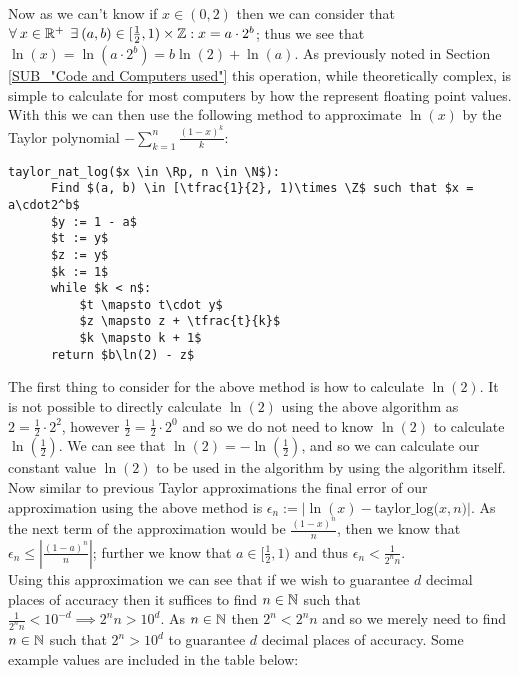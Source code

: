 Now as we can't know if \(x \in (0,2)\) then we can consider that \(\forall\: x \in \mathbb{R}^+\:\: \exists\: (a, b) \in [\frac{1}{2}, 1)\times\mathbb{Z} : x = a\cdot2^b\); thus we see that \(\ln(x) = \ln(a\cdot2^b) = b\ln(2) + \ln(a)\). As previously noted in Section \ref{SUB_"Code and Computers used"} this operation, while theoretically complex, is simple to calculate for most computers by how the represent floating point values.\\

With this we can then use the following method to approximate \(\ln(x)\) by the Taylor polynomial \(-\sum_{k=1}^n\frac{(1-x)^k}{k}\):

\begin{lstlisting}[caption={Taylor Method for calculating \(\ln(x)\)},label={PCD_"taylor log"}]
  taylor_nat_log($x \in \Rp, n \in \N$):
      Find $(a, b) \in [\tfrac{1}{2}, 1)\times \Z$ such that $x = a\cdot2^b$
      $y := 1 - a$
      $t := y$
      $z := y$
      $k := 1$
      while $k < n$:
          $t \mapsto t\cdot y$
          $z \mapsto z + \tfrac{t}{k}$
          $k \mapsto k + 1$
      return $b\ln(2) - z$
\end{lstlisting}

The first thing to consider for the above method is how to calculate \(\ln(2)\). It is not possible to directly calculate \(\ln(2)\) using the above algorithm as \(2 = \frac{1}{2}\cdot2^2\), however \(\frac{1}{2} = \frac{1}{2}\cdot2^0\) and so we do not need to know \(\ln(2)\) to calculate \(\ln(\frac{1}{2})\). We can see that \(\ln(2) = -\ln(\frac{1}{2})\), and so we can calculate our constant value \(\ln(2)\) to be used in the algorithm by using the algorithm itself.\\

Now similar to previous Taylor approximations the final error of our approximation using the above method is \(\epsilon_n := |\ln(x) - \textrm{taylor\_log(}x,n\textrm{)}|\). As the next term of the approximation would be \(\tfrac{(1-x)^n}{n}\), then we know that \(\epsilon_n \le \left|\tfrac{(1-a)^n}{n}\right|\); further we know that \(a \in [\tfrac{1}{2}, 1)\) and thus \(\epsilon_n < \tfrac{1}{2^nn}\).\\

Using this approximation we can see that if we wish to guarantee \(d\) decimal places of accuracy then it suffices to find \(n \in \mathbb{N}\) such that \(\tfrac{1}{2^nn} < 10^{-d} \implies 2^nn > 10^d\). As \(n \in \mathbb{N}\) then \(2^n < 2^nn\) and so we merely need to find \(n \in \mathbb{N}\) such that \(2^n > 10^d\) to guarantee \(d\) decimal places of accuracy. Some example values are included in the table below:\\

